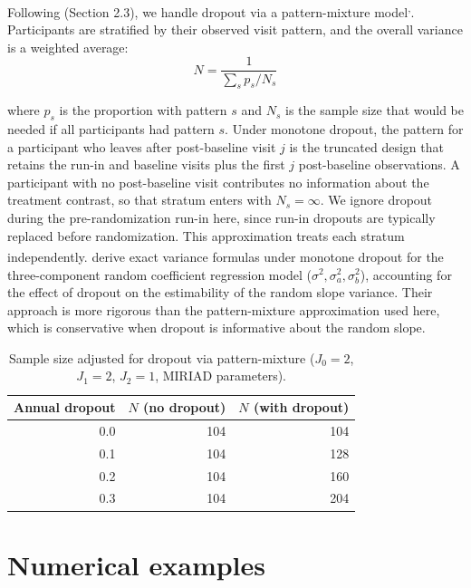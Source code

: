 \documentclass[
  11pt,
]{article}
\begin{document}
Following\textsuperscript{} (Section 2.3), we handle dropout
via a pattern-mixture model\textsuperscript{,}.
Participants are stratified by their observed visit
pattern, and the overall variance is a weighted average:
\begin{equation}
  N = \frac{1}{\sum_{s} p_s / N_s}
\end{equation}

where \(p_s\) is the proportion with pattern \(s\) and \(N_s\)
is the sample size that would be needed if all
participants had pattern \(s\). Under monotone dropout,
the pattern for a participant who leaves after
post-baseline visit \(j\) is the truncated design that
retains the run-in and baseline visits plus the first
\(j\) post-baseline observations. A participant with no
post-baseline visit contributes no information about the
treatment contrast, so that stratum enters with
\(N_s = \infty\). We ignore dropout during the
pre-randomization run-in here, since run-in dropouts are
typically replaced before randomization. This
approximation treats each stratum independently.\textsuperscript{}
derive exact variance formulas under monotone dropout
for the three-component random coefficient regression
model (\(\sigma^2, \sigma_a^2, \sigma_b^2\)), accounting
for the effect of dropout on the estimability of the
random slope variance. Their approach is more rigorous
than the pattern-mixture approximation used here, which
is conservative when dropout is informative about the
random slope.

\begin{table}

\caption{\label{tab:dropout}Sample size adjusted for dropout via pattern-mixture ($J_0=2$, $J_1=2$, $J_2=1$, MIRIAD parameters).}
\centering
\begin{tabular}[t]{rrr}
\toprule
Annual dropout & $N$ (no dropout) & $N$ (with dropout)\\
\midrule
0.0 & 104 & 104\\
0.1 & 104 & 128\\
0.2 & 104 & 160\\
0.3 & 104 & 204\\
\bottomrule
\end{tabular}
\end{table}

\section{Numerical examples}\label{numerical-examples}
\end{document}
